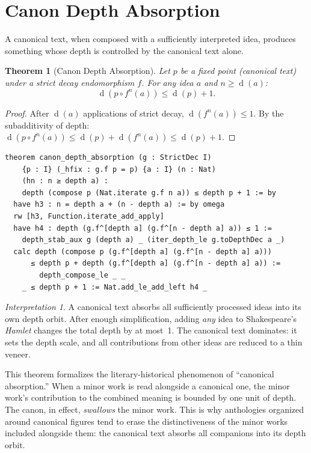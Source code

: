 \documentclass[11pt,openany]{book}
\theoremstyle{definition}
\theoremstyle{plain}
\newtheorem{theorem}[axiom]{Theorem}
\theoremstyle{remark}
\newtheorem{interpretation}[axiom]{Interpretation}
\newcommand{\compose}{\circ}                 %
\newcommand{\depth}{\operatorname{d}}       %
\begin{document}
\section{Canon Depth Absorption}

A canonical text, when composed with a sufficiently interpreted idea, produces something whose depth is controlled by the canonical text alone.

\begin{theorem}[Canon Depth Absorption]
\label{thm:canon-absorption}
Let $p$ be a fixed point (canonical text) under a strict decay endomorphism $f$. For any idea $a$ and $n \geq \depth(a)$:
\[
\depth(p \compose f^n(a)) \leq \depth(p) + 1.
\]
\end{theorem}

\begin{proof}
After $\depth(a)$ applications of strict decay, $\depth(f^n(a)) \leq 1$. By the subadditivity of depth: $\depth(p \compose f^n(a)) \leq \depth(p) + \depth(f^n(a)) \leq \depth(p) + 1$.
\end{proof}

\begin{lstlisting}[language=Lean4]
theorem canon_depth_absorption (g : StrictDec I)
    {p : I} (_hfix : g.f p = p) {a : I} (n : Nat)
    (hn : n ≥ depth a) :
    depth (compose p (Nat.iterate g.f n a)) ≤ depth p + 1 := by
  have h3 : n = depth a + (n - depth a) := by omega
  rw [h3, Function.iterate_add_apply]
  have h4 : depth (g.f^[depth a] (g.f^[n - depth a] a)) ≤ 1 :=
    depth_stab_aux g (depth a) _ (iter_depth_le g.toDepthDec a _)
  calc depth (compose p (g.f^[depth a] (g.f^[n - depth a] a)))
      ≤ depth p + depth (g.f^[depth a] (g.f^[n - depth a] a)) :=
        depth_compose_le _ _
    _ ≤ depth p + 1 := Nat.add_le_add_left h4 _
\end{lstlisting}

\begin{interpretation}
A canonical text absorbs all sufficiently processed ideas into its own depth orbit. After enough simplification, adding \emph{any} idea to Shakespeare's \textit{Hamlet} changes the total depth by at most~1. The canonical text dominates: it sets the depth scale, and all contributions from other ideas are reduced to a thin veneer.

This theorem formalizes the literary-historical phenomenon of ``canonical absorption.'' When a minor work is read alongside a canonical one, the minor work's contribution to the combined meaning is bounded by one unit of depth. The canon, in effect, \emph{swallows} the minor work. This is why anthologies organized around canonical figures tend to erase the distinctiveness of the minor works included alongside them: the canonical text absorbs all companions into its depth orbit.
\end{interpretation}
\end{document}
